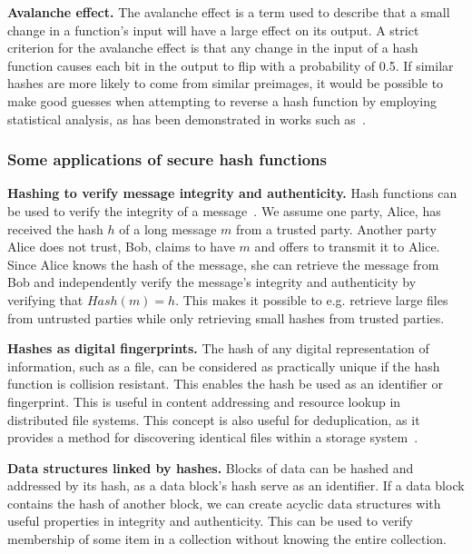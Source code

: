\noindent
{\bf Avalanche effect.}
The avalanche effect is a term used to describe that a small change in a function's input will have a large effect on its output. A strict criterion for the avalanche effect is that any change in the input of a hash function causes each bit in the output to flip with a probability of 0.5. If similar hashes are more likely to come from similar preimages, it would be possible to make good guesses when attempting to reverse a hash function by employing statistical analysis, as has been demonstrated in works such as~\cite{wang_cryptanalysis_2005}.

\subsubsection{Some applications of secure hash functions}

\noindent
{\bf Hashing to verify message integrity and authenticity.}
Hash functions can be used to verify the integrity of a message~\cite[p.~158--164]{lindell2014introduction}. We assume one party, Alice, has received the hash $h$ of a long message $m$ from a trusted party. Another party Alice does not trust, Bob, claims to have $m$ and offers to transmit it to Alice. Since Alice knows the hash of the message, she can retrieve the message from Bob and independently verify the message's integrity and authenticity by verifying that $Hash(m) = h$. This makes it possible to e.g. retrieve large files from untrusted parties while only retrieving small hashes from trusted parties.

\noindent
{\bf Hashes as digital fingerprints.}
The hash of any digital representation of information, such as a file, can be considered as practically unique if the hash function is collision resistant. This enables the hash be used as an identifier or fingerprint. This is useful in content addressing and resource lookup in distributed file systems. This concept is also useful for deduplication, as it provides a method for discovering identical files within a storage system~\cite[p.~182-183]{lindell2014introduction}. 

\noindent
{\bf Data structures linked by hashes.}
Blocks of data can be hashed and addressed by its hash, as a data block's hash serve as an identifier. If a data block contains the hash of another block, we can create acyclic data structures with useful properties in integrity and authenticity. This can be used to verify membership of some item in a collection without knowing the entire collection.

